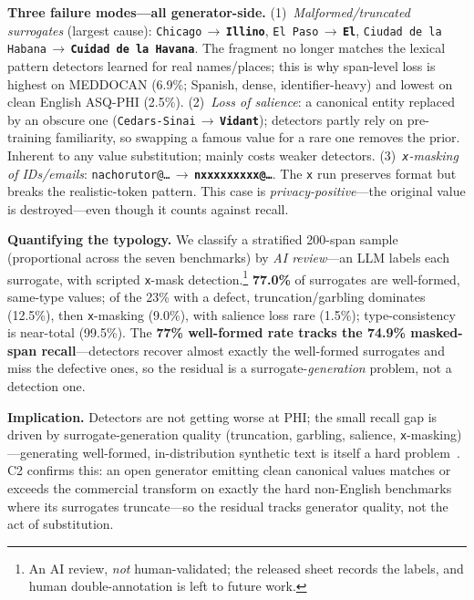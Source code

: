 \documentclass[pmlr,twocolumn,10pt]{jmlr}
\newcommand{\oldv}[1]{\textcolor{cclay}{#1}}
\newcommand{\newv}[1]{\textcolor{caccent}{\textbf{#1}}}
\newcommand{\arr}{\,$\rightarrow$\,\allowbreak}
\newcommand{\tp}[1]{\texttt{#1}}
\begin{document}
\textbf{Three failure modes---all generator-side.}
(1)~\emph{Malformed/truncated surrogates} (largest cause): \oldv{\tp{Chicago}}\arr\newv{\tp{Illino}}, \oldv{\tp{El~Paso}}\arr\newv{\tp{El}}, \oldv{\tp{Ciudad de la Habana}}\arr\newv{\tp{Cuidad de la Havana}}. The fragment no longer matches the lexical pattern detectors learned for real names/places; this is why span-level loss is highest on MEDDOCAN (6.9\%; Spanish, dense, identifier-heavy) and lowest on clean English ASQ-PHI (2.5\%).
(2)~\emph{Loss of salience}: a canonical entity replaced by an obscure one (\oldv{\tp{Cedars-Sinai}}\arr\newv{\tp{Vidant}}); detectors partly rely on pre-training familiarity, so swapping a famous value for a rare one removes the prior. Inherent to any value substitution; mainly costs weaker detectors.
(3)~\emph{\tp{x}-masking of IDs/emails}: \oldv{\tp{nachorutor@\dots}}\arr\newv{\tp{nxxxxxxxxx@\dots}}. The \tp{x} run preserves format but breaks the realistic-token pattern. This case is \emph{privacy-positive}---the original value is destroyed---even though it counts against recall.

\textbf{Quantifying the typology.} We classify a stratified 200-span sample (proportional across the seven benchmarks) by \emph{AI review}---an LLM labels each surrogate, with scripted \tp{x}-mask detection.\footnote{An AI review, \emph{not} human-validated; the released sheet records the labels, and human double-annotation is left to future work.} \textbf{77.0\%} of surrogates are well-formed, same-type values; of the 23\% with a defect, truncation/garbling dominates (12.5\%), then \tp{x}-masking (9.0\%), with salience loss rare (1.5\%); type-consistency is near-total (99.5\%). The \textbf{77\% well-formed rate tracks the 74.9\% masked-span recall}---detectors recover almost exactly the well-formed surrogates and miss the defective ones, so the residual is a surrogate-\emph{generation} problem, not a detection one.

\textbf{Implication.} Detectors are not getting worse at PHI; the small recall gap is driven by surrogate-generation quality (truncation, garbling, salience, \tp{x}-masking)---generating well-formed, in-distribution synthetic text is itself a hard problem~\citep{bao2024amr}. C2 confirms this: an open generator emitting clean canonical values matches or exceeds the commercial transform on exactly the hard non-English benchmarks where its surrogates truncate---so the residual tracks generator quality, not the act of substitution.
\end{document}
